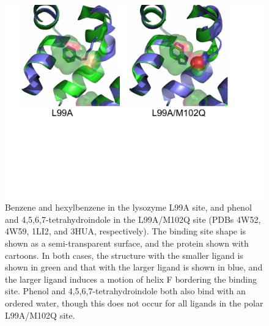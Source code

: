 \documentclass[aps,pre,twocolumn,nofootinbib,superscriptaddress,10pt, final,tightenlines]{revtex4-1}
\begin{document}
\begin{figure}
\includegraphics[width=\textwidth]{figures/lysozyme.pdf}
\caption{\label{fig:lysozyme} Benzene and hexylbenzene in the lysozyme L99A site, and phenol and 4,5,6,7-tetrahydroindole in the L99A/M102Q site (PDBs 4W52, 4W59, 1LI2, and 3HUA, respectively). The binding site shape is shown as a semi-transparent surface, and the protein shown with cartoons. In both cases, the structure with the smaller ligand is shown in green and that with the larger ligand is shown in blue, and the larger ligand induces a motion of helix F bordering the binding site. Phenol and 4,5,6,7-tetrahydroindole both also bind with an ordered water, though this does not occur for all ligands in the polar L99A/M102Q site.}
\end{figure}
\end{document}
